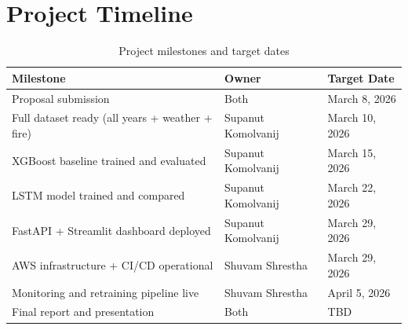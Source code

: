 \documentclass[12pt,a4paper]{report}
\begin{document}
\section{Project Timeline}

\begin{table}[H]
\centering
\caption{Project milestones and target dates}
\label{tab:timeline}
\begin{tabular}{@{}lll@{}}
\toprule
\textbf{Milestone} & \textbf{Owner} & \textbf{Target Date} \\
\midrule
Proposal submission & Both & March 8, 2026 \\
Full dataset ready (all years + weather + fire) & Supanut Komolvanij & March 10, 2026 \\
XGBoost baseline trained and evaluated & Supanut Komolvanij & March 15, 2026 \\
LSTM model trained and compared & Supanut Komolvanij & March 22, 2026 \\
FastAPI + Streamlit dashboard deployed & Supanut Komolvanij & March 29, 2026 \\
AWS infrastructure + CI/CD operational & Shuvam Shrestha & March 29, 2026 \\
Monitoring and retraining pipeline live & Shuvam Shrestha & April 5, 2026 \\
Final report and presentation & Both & TBD \\
\bottomrule
\end{tabular}
\end{table}
\end{document}
